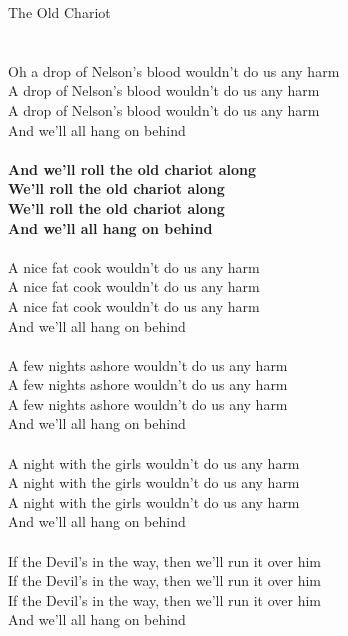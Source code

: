 \documentclass[letterpaper,9pt]{article}
\begin{document}
\newpage
{}
\huge
The Old Chariot\\
\\
\Large
\noindent
\\Oh a drop of Nelson's blood wouldn't do us any harm
\\A drop of Nelson's blood wouldn't do us any harm
\\A drop of Nelson's blood wouldn't do us any harm
\\And we'll all hang on behind
\\
\\\textbf{And we'll roll the old chariot along
\\We'll roll the old chariot along
\\We'll roll the old chariot along
\\And we'll all hang on behind}
\\
\\A nice fat cook wouldn't do us any harm
\\A nice fat cook wouldn't do us any harm
\\A nice fat cook wouldn't do us any harm
\\And we'll all hang on behind
\\
\\A few nights ashore wouldn't do us any harm
\\A few nights ashore wouldn't do us any harm
\\A few nights ashore wouldn't do us any harm
\\And we'll all hang on behind
\\
\\A night with the girls wouldn't do us any harm
\\A night with the girls wouldn't do us any harm
\\A night with the girls wouldn't do us any harm
\\And we'll all hang on behind
\\
\\If the Devil's in the way, then we'll run it over him
\\If the Devil's in the way, then we'll run it over him
\\If the Devil's in the way, then we'll run it over him
\\And we'll all hang on behind
\end{document}
